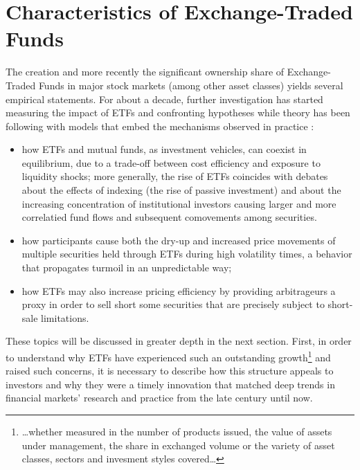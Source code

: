 \section{Characteristics of Exchange-Traded Funds}
\label{sec:ETFCharacteristics}
The creation and more recently the significant ownership share of Exchange-Traded Funds in major stock markets (among other asset classes) yields several empirical statements. For about a decade, further investigation has started measuring the impact of ETFs and confronting hypotheses while theory has been following with models that embed the mechanisms observed in practice :
\begin{itemize}
  \item how ETFs and mutual funds, as investment vehicles, can coexist in equilibrium, due to a trade-off between cost efficiency and exposure to liquidity shocks; more generally, the rise of ETFs coincides with debates about the effects of indexing (the rise of passive investment) and about the increasing concentration of institutional investors causing larger and more correlatied fund flows and subsequent comovements among securities.
\item how participants cause both the dry-up and increased price movements of multiple securities held through ETFs during high volatility times, a behavior that propagates turmoil in an unpredictable way;
  \item how ETFs may also increase pricing efficiency by providing arbitrageurs a proxy in order to sell short some securities that are precisely subject to short-sale limitations.
  \end{itemize}

These topics will be discussed in greater depth in the next section. First, in order to understand why ETFs have experienced such an outstanding growth\footnote{\dots whether measured in the number of products issued, the value of assets under management, the share in exchanged volume or the variety of asset classes, sectors and invesment styles covered\dots} and raised such concerns, it is necessary to describe how this structure appeals to investors and why they were a timely innovation that matched deep trends in financial markets' research and practice from the late  century until now.
